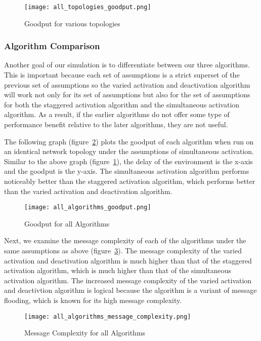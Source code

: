 \documentclass[english]{article}
\begin{document}
\begin{figure}[ht]
\centering
\texttt{[image: all\_topologies\_goodput.png]}
\caption{Goodput for various topologies}
\label{VaryingTopologyGoodput}
\end{figure}

\subsubsection{Algorithm Comparison}

Another goal of our simulation is to differentiate between our three algorithms. This is important because each set of assumptions is a strict superset of the previous set of assumptions so the varied activation and deactivation algorithm will work not only for its set of assumptions but also for the set of assumptions for both the staggered activation algorithm and the simultaneous activation algorithm. As a result, if the earlier algorithms do not offer some type of performance benefit relative to the later algorithms, they are not useful.

The following graph (figure~\ref{AllAlgorithmsGoodput}) plots the goodput of each algorithm when run on an identical network topology under the assumptions of simultaneous activation. Similar to the above graph (figure~\ref{VaryingTopologyGoodput}), the delay of the environment is the x-axis and the goodput is the y-axis. The simultaneous activation algorithm performs noticeably better than the staggered activation algorithm, which performs better than the varied activation and deactivation algorithm.

\begin{figure}[ht]
\centering
\texttt{[image: all\_algorithms\_goodput.png]}
\caption{Goodput for all Algorithms}
\label{AllAlgorithmsGoodput}
\end{figure}

Next, we examine the message complexity of each of the algorithms under the same assumptions as above (figure~\ref{AllAlgorithmsMessageComplexity}). The message complexity of the varied activation and deactivation algorithm is much higher than that of the staggered activation algorithm, which is much higher than that of the simultaneous activation algorithm. The increased message complexity of the varied activation and deactivtion algorithm is logical because the algorithm is a variant of message flooding, which is known for its high message complexity.

\begin{figure}[ht]
\centering
\texttt{[image: all\_algorithms\_message\_complexity.png]}
\caption{Message Complexity for all Algorithms}
\label{AllAlgorithmsMessageComplexity}
\end{figure}
\end{document}
